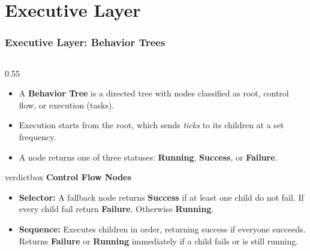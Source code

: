 \documentclass[10pt]{beamer}
\begin{document}
\section{Executive Layer}
\begin{frame}
    \frametitle{Executive Layer: Behavior Trees}
    \begin{columns}[T]
        \begin{column}{0.55\textwidth}
            \small
            \begin{itemize}
                \item A \textbf{Behavior Tree} is a directed tree with nodes classified as root, control flow, or execution (tasks).
                \item Execution starts from the root, which sends \textit{ticks} to its children at a set frequency.
                \item A node returns one of three statuses: \textbf{Running}, \textbf{Success}, or \textbf{Failure}.
            \end{itemize}
            
            \vspace{0.3cm}
            
            \begin{beamercolorbox}[sep=4pt,shadow=true,rounded=true]{verdictbox}
                \centering \textbf{Control Flow Nodes} \\
                \vspace{0.1cm}
                \raggedright
                \footnotesize
                \begin{itemize}
                    \setlength\itemsep{0.3em}
                    \item \textbf{Selector:} A fallback node returns \textbf{Success} if at least one child do not fail. If every child fail return \textbf{Failure}. Otherwise \textbf{Running}.
                    \item \textbf{Sequence:} Executes children in order, returning success if everyone succeeds. Returns \textbf{Failure} or \textbf{Running} immediately if a child fails or is still running.
                \end{itemize}
            \end{beamercolorbox}
        \end{column}
        

\end{columns}
\end{frame}
\end{document}
